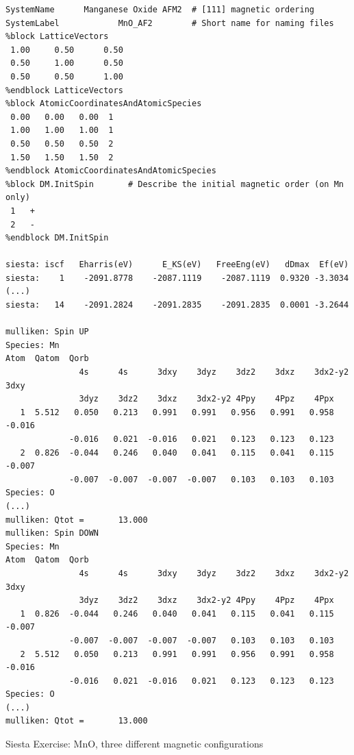 \documentclass[12pt]{article}
\begin{document}
{\footnotesize
\begin{verbatim}
SystemName      Manganese Oxide AFM2  # [111] magnetic ordering
SystemLabel            MnO_AF2        # Short name for naming files    
%block LatticeVectors
 1.00     0.50      0.50
 0.50     1.00      0.50
 0.50     0.50      1.00
%endblock LatticeVectors
%block AtomicCoordinatesAndAtomicSpecies
 0.00   0.00   0.00  1
 1.00   1.00   1.00  1
 0.50   0.50   0.50  2
 1.50   1.50   1.50  2
%endblock AtomicCoordinatesAndAtomicSpecies
%block DM.InitSpin       # Describe the initial magnetic order (on Mn only)
 1   +
 2   -
%endblock DM.InitSpin

siesta: iscf   Eharris(eV)      E_KS(eV)   FreeEng(eV)   dDmax  Ef(eV)
siesta:    1    -2091.8778    -2087.1119    -2087.1119  0.9320 -3.3034
(...)
siesta:   14    -2091.2824    -2091.2835    -2091.2835  0.0001 -3.2644

mulliken: Spin UP
Species: Mn
Atom  Qatom  Qorb
               4s      4s      3dxy    3dyz    3dz2    3dxz    3dx2-y2 3dxy
               3dyz    3dz2    3dxz    3dx2-y2 4Ppy    4Ppz    4Ppx
   1  5.512   0.050   0.213   0.991   0.991   0.956   0.991   0.958  -0.016
             -0.016   0.021  -0.016   0.021   0.123   0.123   0.123
   2  0.826  -0.044   0.246   0.040   0.041   0.115   0.041   0.115  -0.007
             -0.007  -0.007  -0.007  -0.007   0.103   0.103   0.103
Species: O
(...)
mulliken: Qtot =       13.000
mulliken: Spin DOWN
Species: Mn
Atom  Qatom  Qorb
               4s      4s      3dxy    3dyz    3dz2    3dxz    3dx2-y2 3dxy
               3dyz    3dz2    3dxz    3dx2-y2 4Ppy    4Ppz    4Ppx
   1  0.826  -0.044   0.246   0.040   0.041   0.115   0.041   0.115  -0.007
             -0.007  -0.007  -0.007  -0.007   0.103   0.103   0.103
   2  5.512   0.050   0.213   0.991   0.991   0.956   0.991   0.958  -0.016
             -0.016   0.021  -0.016   0.021   0.123   0.123   0.123
Species: O
(...)
mulliken: Qtot =       13.000
\end{verbatim}
}
\newpage
\thispagestyle{empty}
\normalsize
\centerline{\Large {\sc Siesta} Exercise: 
MnO, three different magnetic configurations}
\bigskip
\end{document}
